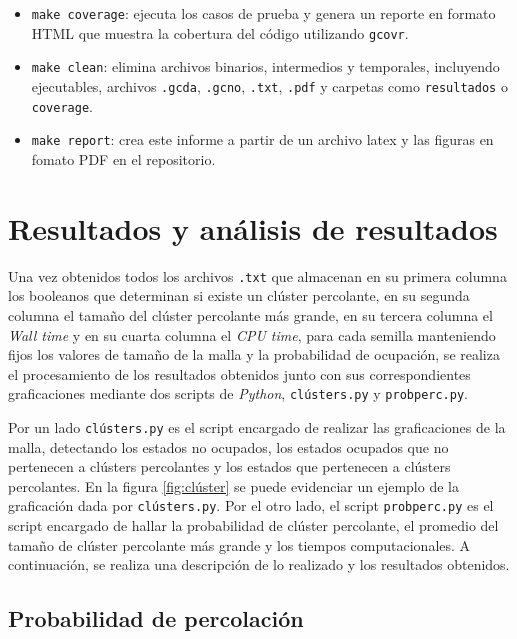 \documentclass[%
 reprint,
 amsmath,amssymb,
 aps,
]{revtex4-2}
\begin{document}
\begin{itemize}
    \item \texttt{make coverage}: ejecuta los casos de prueba y genera un reporte en formato HTML que muestra la cobertura del código utilizando \texttt{gcovr}.
    
    \item \texttt{make clean}: elimina archivos binarios, intermedios y temporales, incluyendo ejecutables, archivos \texttt{.gcda}, \texttt{.gcno}, \texttt{.txt}, \texttt{.pdf} y carpetas como \texttt{resultados} o \texttt{coverage}.

    \item \texttt{make report}: crea este informe a partir de un archivo latex y las figuras en fomato PDF en el repositorio.
    
\end{itemize}

\section{Resultados y análisis de resultados}

Una vez obtenidos todos los archivos \texttt{.txt} que almacenan en su primera columna los booleanos que determinan si existe un clúster percolante, en su segunda columna el tamaño del clúster percolante más grande, en su tercera columna el \textit{Wall time} y en su cuarta columna el \textit{CPU time}, para cada semilla manteniendo fijos los valores de tamaño de la malla y la probabilidad de ocupación, se realiza el procesamiento de los resultados obtenidos junto con sus correspondientes graficaciones mediante dos scripts de \textit{Python}, \texttt{clústers.py} y \texttt{probperc.py}.
\vspace{0.2 cm}

Por un lado \texttt{clústers.py} es el script encargado de realizar las graficaciones de la malla, detectando los estados no ocupados, los estados ocupados que no pertenecen a clústers percolantes y los estados que pertenecen a clústers percolantes. En la figura \ref{fig:clúster} se puede evidenciar un ejemplo de la graficación dada por \texttt{clústers.py}. Por el otro lado, el script \texttt{probperc.py} es el script encargado de hallar la probabilidad de clúster percolante, el promedio del tamaño de clúster percolante más grande y los tiempos computacionales. A continuación, se realiza una descripción de lo realizado y los resultados obtenidos.

\subsection{Probabilidad de percolación}
\end{document}
